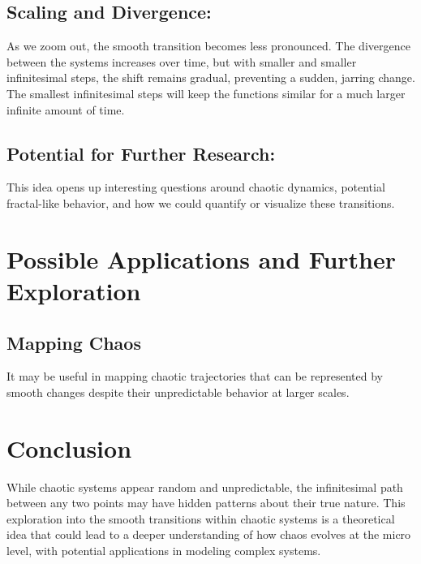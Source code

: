 \documentclass[11pt, a4paper]{article}
\begin{document}
	\subsection{Scaling and Divergence:} 
		As we zoom out, the smooth transition becomes less pronounced. The divergence between the systems increases over time, but with smaller and smaller infinitesimal steps, the shift remains gradual, preventing a sudden, jarring change. The smallest infinitesimal steps will keep the functions similar for a much larger infinite amount of time.

	\subsection{Potential for Further Research:} 
		This idea opens up interesting questions around chaotic dynamics, potential fractal-like behavior, and how we could quantify or visualize these transitions.

	\section{Possible Applications and Further Exploration}
	\subsection{Mapping Chaos}
	It may be useful in mapping chaotic trajectories that can be represented by smooth changes despite their unpredictable behavior at larger scales.

	\section{Conclusion}
	While chaotic systems appear random and unpredictable, the infinitesimal path between any two points may have hidden patterns about their true nature. This exploration into the smooth transitions within chaotic systems is a theoretical idea that could lead to a deeper understanding of how chaos evolves at the micro level, with potential applications in modeling complex systems.
\end{document}
